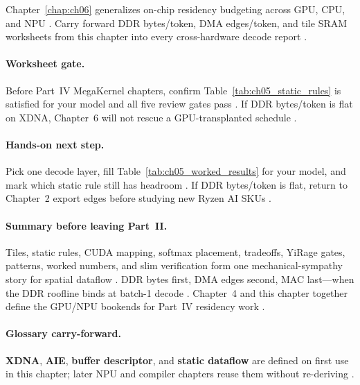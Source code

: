 Chapter~\ref{chap:ch06} generalizes on-chip residency budgeting across GPU, CPU, and NPU \citep{yirage2026}.
Carry forward DDR bytes/token, DMA edges/token, and tile SRAM worksheets from this chapter into every cross-hardware decode report \citep{patel2025llminference,amd2024xdna}.

\paragraph{Worksheet gate.}
Before Part~IV MegaKernel chapters, confirm Table~\ref{tab:ch05_static_rules} is satisfied for your model and all five review gates pass \citep{yirage2026,amd2024aie}.
If DDR bytes/token is flat on XDNA, Chapter~6 will not rescue a GPU-transplanted schedule \citep{chen2020compilerbasedhardw,memoryfloor2026}.

\paragraph{Hands-on next step.}
Pick one decode layer, fill Table~\ref{tab:ch05_worked_results} for your model, and mark which static rule still has headroom \citep{patel2025llminference,amd2024xdna}.
If DDR bytes/token is flat, return to Chapter~2 export edges before studying new Ryzen AI SKUs \citep{chen2020compilerbasedhardw,memoryfloor2026,yirage2026}.

\paragraph{Summary before leaving Part~II.}
Tiles, static rules, CUDA mapping, softmax placement, tradeoffs, YiRage gates, patterns, worked numbers, and slim verification form one mechanical-sympathy story for spatial dataflow \citep{amd2024xdna,amd2024aie,yirage2026,chen2020compilerbasedhardw,dao2022flashattention,taxbreak2026,memoryfloor2026,patel2025llminference,nvidia2022hopper,semianalysis2024tma,dlbook}.
DDR bytes first, DMA edges second, MAC last---when the DDR roofline binds at batch-1 decode \citep{memoryfloor2026,taxbreak2026,amd2024xdna}.
Chapter~4 and this chapter together define the GPU/NPU bookends for Part~IV residency work \citep{yirage2026,chen2020compilerbasedhardw}.

\paragraph{Glossary carry-forward.}
\textbf{XDNA}, \textbf{AIE}, \textbf{buffer descriptor}, and \textbf{static dataflow} are defined on first use in this chapter; later NPU and compiler chapters reuse them without re-deriving \citep{amd2024xdna,amd2024aie,yirage2026,dao2022flashattention,patel2025llminference,chen2020compilerbasedhardw}.

